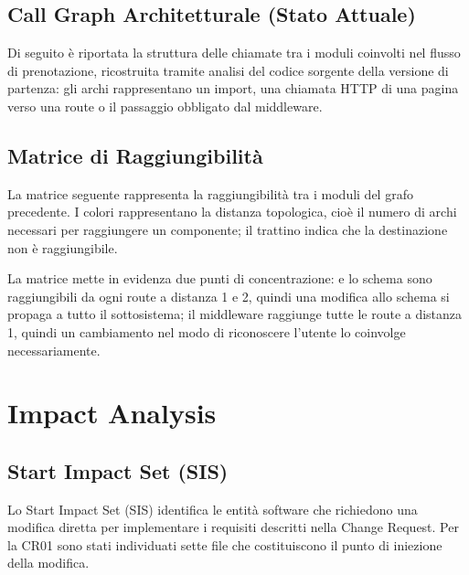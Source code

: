 \documentclass[11pt,a4paper,oneside,openany]{book}
\begin{document}
\subsection{Call Graph Architetturale (Stato Attuale)}

Di seguito è riportata la struttura delle chiamate tra i moduli coinvolti nel
flusso di prenotazione, ricostruita tramite analisi del codice sorgente della
versione di partenza: gli archi rappresentano un import, una chiamata HTTP di
una pagina verso una route o il passaggio obbligato dal middleware.


\subsection{Matrice di Raggiungibilità}

La matrice seguente rappresenta la raggiungibilità tra i moduli del grafo
precedente. I colori rappresentano la distanza topologica, cioè il numero di
archi necessari per raggiungere un componente; il trattino indica che la
destinazione non è raggiungibile.



La matrice mette in evidenza due punti di concentrazione: 
e lo schema sono raggiungibili da ogni route a distanza 1 e 2, quindi una
modifica allo schema si propaga a tutto il sottosistema; il middleware
raggiunge tutte le route a distanza 1, quindi un cambiamento nel modo di
riconoscere l'utente lo coinvolge necessariamente.

\section{Impact Analysis}

\subsection{Start Impact Set (SIS)}

Lo Start Impact Set (SIS) identifica le entità software che richiedono una
modifica diretta per implementare i requisiti descritti nella Change Request.
Per la CR01 sono stati individuati sette file che costituiscono il punto di
iniezione della modifica.
\end{document}
